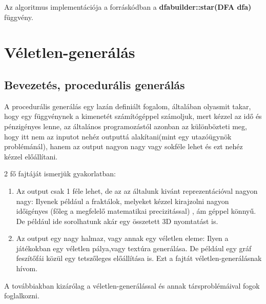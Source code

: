 \documentclass[12pt]{report}
\theoremstyle{definition}
\begin{document}
Az algoritmus implementációja a forráskódban a \textbf{dfabuilder::star(DFA dfa)} függvény.

\chapter{Véletlen-generálás}
\section{Bevezetés, procedurális generálás}
A procedurális generálás egy lazán definiált fogalom, általában olyasmit takar, hogy egy függvénynek a kimenetét számítógéppel számoljuk, mert kézzel az idő és pénzigényes lenne, az általános programozástól azonban az különbözteti meg, hogy itt nem az inputot nehéz outputtá alakítani(mint egy utazóügynök problémánál), hanem az output nagyon nagy vagy sokféle lehet és ezt nehéz kézzel előállítani.

2 fő fajtáját ismerjük gyakorlatban:
\begin{enumerate}
\item Az output csak 1 féle lehet, de az az általunk kivánt reprezentációval nagyon nagy:
Ilyenek például a fraktálok, melyeket kézzel kirajzolni nagyon időigényes (főleg a megfelelő matematikai precizitással) , ám géppel könnyű. De például ide sorolhatunk akár egy összetett 3D nyomtatást is.
\item Az output egy nagy halmaz, vagy annak egy véletlen eleme:
Ilyen a játékokban egy véletlen pálya,vagy textúra generálása. De például egy gráf feszítőfái közül egy tetszőleges előállítása is. Ezt a fajtát véletlen-generálásnak hívom.
\end{enumerate}
A továbbiakban kizárólag a véletlen-generálással és annak társproblémáival fogok foglalkozni.
\end{document}
